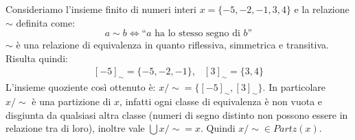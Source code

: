 \begin{example}
	Consideriamo l'insieme finito di numeri interi $x =\{-5,-2,-1,3,4\}$ e la relazione $\sim$ definita come: $$a \sim b  \iff  \text{``$a$ ha lo stesso segno di $b$''}$$ 
	$\sim$ è una relazione di equivalenza in quanto riflessiva, simmetrica e transitiva. Risulta quindi:
	\begin{displaymath}
		\begin{array}{ll}
			[-5]_{\sim}=\{-5,-2,-1\}, & [3]_{\sim}=\{3,4\}
		\end{array}
	\end{displaymath}
	L'insieme quoziente così ottenuto è: $x/{\sim}=\{[-5]_{\sim},[3]_{\sim}\}$.	In particolare $x/{\sim}$ è una partizione di $x$, infatti ogni classe di equivalenza è non vuota e disgiunta da qualsiasi altra classe (numeri di segno distinto non possono essere in relazione tra di loro), inoltre vale $\bigcup x/{\sim} = x$. Quindi $x/{\sim} \in Partz(x)$.
\end{example}

